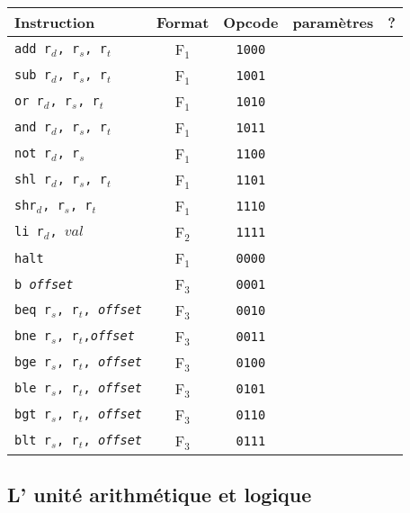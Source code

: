 \documentclass[a4paper]{article}
\begin{document}
			\begin{tabular}{|p{4cm}|c|c|c|c|}
			\hline Instruction & Format & Opcode & paramètres & ? \\ 
			\hline \texttt{add r$_{d}$, r$_{s}$, r$_{t}$} & F$_{1}$ & \texttt{1000} &  &  \\ 
			\hline \texttt{sub r$_{d}$, r$_{s}$, r$_{t}$} & F$_{1}$ & \texttt{1001} &  &  \\ 
			\hline \texttt{or r$_{d}$, r$_{s}$, r$_{t}$} & F$_{1}$ & \texttt{1010} &  &  \\ 
			\hline \texttt{and r$_{d}$, r$_{s}$, r$_{t}$} & F$_{1}$ & \texttt{1011} &  &  \\ 
			\hline \texttt{not r$_{d}$, r$_{s}$} & F$_{1}$ & \texttt{1100} &  &  \\ 
			\hline \texttt{shl r$_{d}$, r$_{s}$, r$_{t}$} & F$_{1}$ & \texttt{1101} &  &  \\ 
			\hline \texttt{shr$_{d}$, r$_{s}$, r$_{t}$} & F$_{1}$ & \texttt{1110} &  &  \\ 
			\hline \texttt{li r$_{d}$, $val$} & F$_{2}$ & \texttt{1111} &  &  \\ 
			\hline \texttt{halt} & F$_{1}$ & \texttt{0000} &  &  \\ 
			\hline \texttt{b \textit{offset}} & F$_{3}$ & \texttt{0001} &  &  \\
			\hline \texttt{beq r$_{s}$, r$_{t}$, \textit{offset}} & F$_{3}$ & \texttt{0010} &  &  \\ 
			\hline \texttt{bne r$_{s}$, r$_{t}$,\textit{offset}} & F$_{3}$ & \texttt{0011} &  &  \\ 
			\hline \texttt{bge r$_{s}$, r$_{t}$, \textit{offset}} & F$_{3}$ & \texttt{0100} &  &  \\ 
			\hline \texttt{ble r$_{s}$, r$_{t}$, \textit{offset}} & F$_{3}$ & \texttt{0101} &  &  \\ 
			\hline \texttt{bgt r$_{s}$, r$_{t}$, \textit{offset}} & F$_{3}$ & \texttt{0110} &  &  \\ 
			\hline \texttt{blt r$_{s}$, r$_{t}$, \textit{offset}} & F$_{3}$ & \texttt{0111} &  &  \\ 

			\hline 
			\end{tabular}
			
			\paragraph{}{}
	
		\subsection{L' unité arithmétique et logique}
			
			
\end{document}
